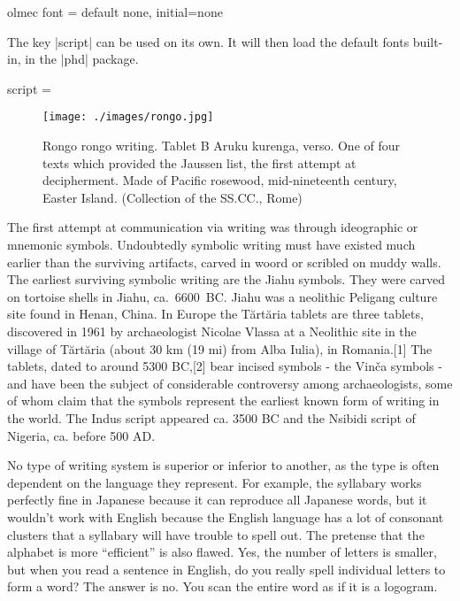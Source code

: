 \def\olmecfontstore{}

\cxset{olmec font/.store in=\olmecfontstore}


\begin{docKey}[phd]{olmec font}{ = } {default none, initial=none}
\end{docKey}

The key |script| can be used on its own. It will then load the default fonts built-in, in the |phd| package.


\begin{docKey}[phd]{script =}{ }{}
\end{docKey}

\begin{figure}[b]
\centering
\texttt{[image: ./images/rongo.jpg]}
\caption{Rongo rongo writing. Tablet B Aruku kurenga, verso. One of four texts which provided the Jaussen list, the first attempt at decipherment. Made of Pacific rosewood, mid-nineteenth century, Easter Island.
(Collection of the SS.CC., Rome)}

\end{figure}

The first attempt  at communication via writing was through ideographic or mnemonic symbols. Undoubtedly symbolic writing must have existed much earlier than the surviving artifacts, carved in woord or scribled on muddy walls. The earliest surviving symbolic writing are the Jiahu symbols. They were carved on tortoise shells in Jiahu, ca.~6600~BC. Jiahu was a neolithic Peligang culture site found in Henan, China. In Europe the Tărtăria tablets are three tablets, discovered in 1961 by archaeologist Nicolae Vlassa at a Neolithic site in the village of Tărtăria (about 30 km (19 mi) from Alba Iulia), in Romania.[1] The tablets, dated to around 5300 BC,[2] bear incised symbols - the Vinča symbols - and have been the subject of considerable controversy among archaeologists, some of whom claim that the symbols represent the earliest known form of writing in the world. The Indus script appeared ca. 3500 BC and the Nsibidi script of Nigeria, ca. before 500 AD. 

No type of writing system is superior or inferior to another, as the type is often dependent on the language they represent. For example, the syllabary works perfectly fine in Japanese because it can reproduce all Japanese words, but it wouldn't work with English because the English language has a lot of consonant clusters that a syllabary will have trouble to spell out. The pretense that the alphabet is more \enquote{efficient} is also flawed. Yes, the number of letters is smaller, but when you read a sentence in English, do you really spell individual letters to form a word? The answer is no. You scan the entire word as if it is a logogram.

